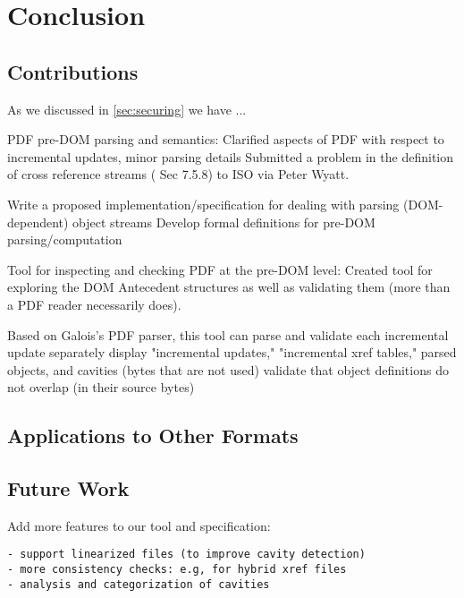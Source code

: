 \section{Conclusion }
\label{sec:conclusion}

\subsection{Contributions}

As we discussed in \cref{sec:securing} we have ...


PDF pre-DOM parsing and semantics:
Clarified aspects of PDF with respect to incremental updates, minor parsing details
Submitted a problem in the definition of cross reference streams
(\cite{isotc171sc2wg8ISO32000220202020} Sec 7.5.8) to
ISO via Peter Wyatt.

Write a proposed implementation/specification for dealing with parsing (DOM-dependent) object streams
Develop formal definitions for pre-DOM parsing/computation

Tool for inspecting and checking PDF at the pre-DOM level:
Created tool for exploring the DOM Antecedent structures as well as validating
them (more than a PDF reader necessarily does).

Based on Galois's  PDF parser, this tool can
parse and validate each incremental update separately
display "incremental updates," "incremental xref tables," parsed objects, and cavities (bytes that are not used)
validate that object definitions do not overlap (in their source bytes)
      
\subsection{Applications to Other Formats}


\subsection{Future Work}

Add more features to our tool and specification:
\begin{lstlisting}[style=meta]
- support linearized files (to improve cavity detection)
- more consistency checks: e.g, for hybrid xref files
- analysis and categorization of cavities
\end{lstlisting}